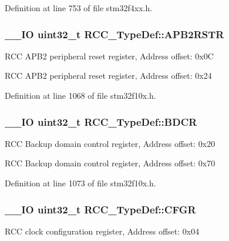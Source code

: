 Definition at line 753 of file stm32f4xx.\-h.

\hypertarget{struct_r_c_c___type_def_a4491ab20a44b70bf7abd247791676a59}{
\subsubsection[{A\-P\-B2\-R\-S\-T\-R}]{\setlength{\rightskip}{0pt plus 5cm}\-\_\-\-\_\-\-I\-O {\bf uint32\-\_\-t} R\-C\-C\-\_\-\-Type\-Def\-::\-A\-P\-B2\-R\-S\-T\-R}}\label{struct_r_c_c___type_def_a4491ab20a44b70bf7abd247791676a59}
R\-C\-C A\-P\-B2 peripheral reset register, Address offset\-: 0x0\-C

R\-C\-C A\-P\-B2 peripheral reset register, Address offset\-: 0x24 

Definition at line 1068 of file stm32f10x.\-h.

\hypertarget{struct_r_c_c___type_def_a05be375db50e8c9dd24fb3bcf42d7cf1}{
\subsubsection[{B\-D\-C\-R}]{\setlength{\rightskip}{0pt plus 5cm}\-\_\-\-\_\-\-I\-O {\bf uint32\-\_\-t} R\-C\-C\-\_\-\-Type\-Def\-::\-B\-D\-C\-R}}\label{struct_r_c_c___type_def_a05be375db50e8c9dd24fb3bcf42d7cf1}
R\-C\-C Backup domain control register, Address offset\-: 0x20

R\-C\-C Backup domain control register, Address offset\-: 0x70 

Definition at line 1073 of file stm32f10x.\-h.

\hypertarget{struct_r_c_c___type_def_a0721b1b729c313211126709559fad371}{
\subsubsection[{C\-F\-G\-R}]{\setlength{\rightskip}{0pt plus 5cm}\-\_\-\-\_\-\-I\-O {\bf uint32\-\_\-t} R\-C\-C\-\_\-\-Type\-Def\-::\-C\-F\-G\-R}}\label{struct_r_c_c___type_def_a0721b1b729c313211126709559fad371}
R\-C\-C clock configuration register, Address offset\-: 0x04

